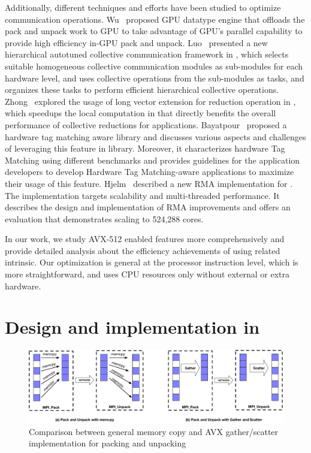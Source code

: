 \documentclass[conference]{IEEEtran}
\begin{document}
Additionally, different techniques and
efforts have been studied to optimize \mpi communication operations.
%
Wu~\cite{wu2016} proposed GPU datatype engine that offloads the pack and unpack
work to GPU to take advantage of GPU's parallel capability to provide
high efficiency in-GPU pack and unpack.
%
Luo~\cite{luo-han} presented a new hierarchical autotuned collective communication
framework in \ompi, which selects suitable homogeneous collective communication
modules as sub-modules for each hardware level, and uses collective operations from
the sub-modules as tasks, and organizes these tasks to perform efficient hierarchical collective operations.
%
Zhong~\cite{avxop} explored the usage of long vector extension for reduction operation in \mpi, which
speedups the local computation in \mpi that directly benefits the overall performance of
collective reductions for applications.
%
Bayatpour~\cite{Bayatpour} proposed a hardware tag matching aware \mpi library and discusses various aspects and challenges of leveraging this feature in \mpi library. Moreover, it characterizes
hardware Tag Matching using different benchmarks and provides guidelines for the
application developers to develop Hardware Tag Matching-aware applications to maximize their usage of this feature.
%
Hjelm~\cite{Hjelm} described a new RMA implementation for \ompi. The implementation targets scalability
and multi-threaded performance. It describes the design and implementation of RMA improvements
and offers an evaluation that demonstrates scaling to 524,288 cores.

In our work, we study AVX-512 enabled features more comprehensively and provide
detailed analysis about the efficiency achievements of using related intrinsic.
Our optimization is general at the processor instruction level, which is more
straightforward, and uses CPU resources only without external or extra hardware.

\section{Design and implementation in \ompi}\label{sec:design}

\begin{figure}[ht]
  \centering
  \includegraphics[width=0.9\linewidth]{send_recv_gs1.pdf}
  \caption{Comparison between general memory copy and AVX gather/scatter implementation for packing and unpacking}
  \label{fig:send_recv_gs1}
\end{figure}
\end{document}
